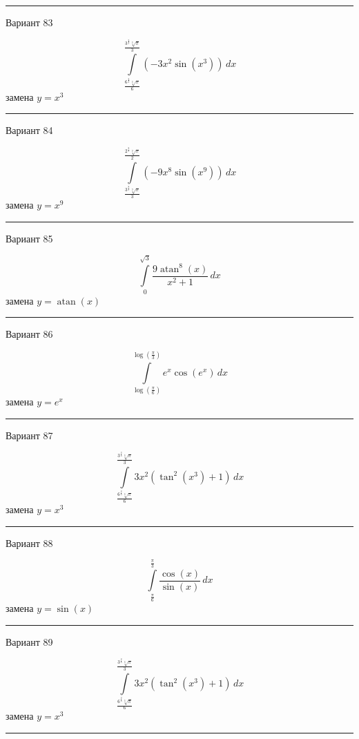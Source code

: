 \documentclass[11pt]{report}
\begin{document}
\rule{\textwidth}{.2mm}

Вариант 83

$$\int\limits_{\frac{6^{\frac{2}{3}} \sqrt[3]{\pi}}{6}}^{\frac{3^{\frac{2}{3}} \sqrt[3]{\pi}}{3}} \left(- 3 x^{2} \sin{\left(x^{3} \right)}\right)\, dx$$
замена $y = x^{3}$



\rule{\textwidth}{.2mm}

Вариант 84

$$\int\limits_{\frac{3^{\frac{8}{9}} \sqrt[9]{\pi}}{3}}^{\frac{2^{\frac{8}{9}} \sqrt[9]{\pi}}{2}} \left(- 9 x^{8} \sin{\left(x^{9} \right)}\right)\, dx$$
замена $y = x^{9}$



\rule{\textwidth}{.2mm}

Вариант 85

$$\int\limits_{0}^{\sqrt{3}} \frac{9 \operatorname{atan}^{8}{\left(x \right)}}{x^{2} + 1}\, dx$$
замена $y = \operatorname{atan}{\left(x \right)}$



\rule{\textwidth}{.2mm}

Вариант 86

$$\int\limits_{\log{\left(\frac{\pi}{6} \right)}}^{\log{\left(\frac{\pi}{3} \right)}} e^{x} \cos{\left(e^{x} \right)}\, dx$$
замена $y = e^{x}$



\rule{\textwidth}{.2mm}

Вариант 87

$$\int\limits_{\frac{6^{\frac{2}{3}} \sqrt[3]{\pi}}{6}}^{\frac{3^{\frac{2}{3}} \sqrt[3]{\pi}}{3}} 3 x^{2} \left(\tan^{2}{\left(x^{3} \right)} + 1\right)\, dx$$
замена $y = x^{3}$



\rule{\textwidth}{.2mm}

Вариант 88

$$\int\limits_{\frac{\pi}{6}}^{\frac{\pi}{3}} \frac{\cos{\left(x \right)}}{\sin{\left(x \right)}}\, dx$$
замена $y = \sin{\left(x \right)}$



\rule{\textwidth}{.2mm}

Вариант 89

$$\int\limits_{\frac{6^{\frac{2}{3}} \sqrt[3]{\pi}}{6}}^{\frac{3^{\frac{2}{3}} \sqrt[3]{\pi}}{3}} 3 x^{2} \left(\tan^{2}{\left(x^{3} \right)} + 1\right)\, dx$$
замена $y = x^{3}$



\rule{\textwidth}{.2mm}
\end{document}
